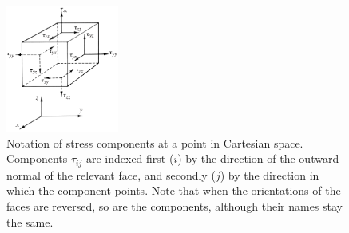 \documentclass[twoside,11pt]		{report}
\begin{document}
\begin{figure}
\begin{center}
\includegraphics[width=0.33\textwidth]{Fung-3.3.eps}
\end{center}
\caption{Notation of stress components at a point in Cartesian
  space. Components $\tau_{ij}$ are indexed first ($i$) by the
  direction of the outward normal of the relevant face, and secondly
  ($j$) by the direction in which the component points.  Note that
  when the orientations of the faces are reversed, so are the
  components, although their names stay the same.}
\label{fig.stress}
\end{figure}
\end{document}
